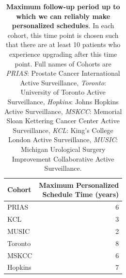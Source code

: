 \begin{table}[!htb]
\small\sf\centering
\caption{\textbf{Maximum follow-up period up to which we can reliably make personalized schedules}. In each cohort, this time point is chosen such that there are at least 10 patients who experience upgrading after this time point. Full names of Cohorts are \textit{PRIAS}: Prostate Cancer International Active Surveillance, \textit{Toronto}: University of Toronto Active Surveillance, \textit{Hopkins}: Johns Hopkins Active Surveillance, \textit{MSKCC}: Memorial Sloan Kettering Cancer Center Active Surveillance, \textit{KCL}: King's College London Active Surveillance, \textit{MUSIC}: Michigan Urological Surgery Improvement Collaborative Active Surveillance.}
\label{tab:max_pred_time_repeat}
\begin{tabular}{l|r}
\hline
\hline
Cohort & \parbox[t]{3.75cm}{Maximum Personalized\\Schedule Time (years)}\\
\hline
PRIAS & 6\\
KCL & 3\\
MUSIC & 2\\
Toronto & 8\\
MSKCC & 6\\
Hopkins & 7\\
\hline
\end{tabular}	
\end{table}

